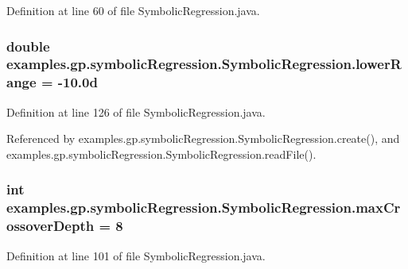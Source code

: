 Definition at line 60 of file Symbolic\-Regression.\-java.

\hypertarget{classexamples_1_1gp_1_1symbolic_regression_1_1_symbolic_regression_a879b8d1c8895ce4cd9bffa224c7005c3}{
\subsubsection[{lower\-Range}]{\setlength{\rightskip}{0pt plus 5cm}double examples.\-gp.\-symbolic\-Regression.\-Symbolic\-Regression.\-lower\-Range = -\/10.\-0d\hspace{0.3cm}{\ttfamily [static]}}}\label{classexamples_1_1gp_1_1symbolic_regression_1_1_symbolic_regression_a879b8d1c8895ce4cd9bffa224c7005c3}


Definition at line 126 of file Symbolic\-Regression.\-java.



Referenced by examples.\-gp.\-symbolic\-Regression.\-Symbolic\-Regression.\-create(), and examples.\-gp.\-symbolic\-Regression.\-Symbolic\-Regression.\-read\-File().

\hypertarget{classexamples_1_1gp_1_1symbolic_regression_1_1_symbolic_regression_a85924723eaa8ede23c6a48d5d3e950a6}{
\subsubsection[{max\-Crossover\-Depth}]{\setlength{\rightskip}{0pt plus 5cm}int examples.\-gp.\-symbolic\-Regression.\-Symbolic\-Regression.\-max\-Crossover\-Depth = 8\hspace{0.3cm}{\ttfamily [static]}}}\label{classexamples_1_1gp_1_1symbolic_regression_1_1_symbolic_regression_a85924723eaa8ede23c6a48d5d3e950a6}


Definition at line 101 of file Symbolic\-Regression.\-java.



